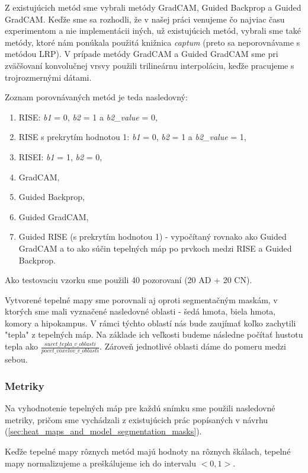 Z existujúcich metód sme vybrali metódy GradCAM, Guided Backprop a Guided GradCAM. Keďže sme sa rozhodli, že v našej práci venujeme čo najviac času experimentom a nie implementácii iných, už existujúcich metód, vybrali sme také metódy, ktoré nám ponúkala použitá knižnica \textit{captum} (preto sa neporovnávame s metódou LRP). V prípade metódy GradCAM a Guided GradCAM sme pri zväčšovaní konvolučnej vrsvy použili trilineárnu interpoláciu, keďže pracujeme s trojrozmernými dátami.

Zoznam porovnávaných metód je teda nasledovný:

\begin{enumerate}[label=\Alph*]
    \item RISE: \textit{b1} = 0, \textit{b2} = 1 a \textit{b2\_value} = 0,
    \item RISE s prekrytím hodnotou 1: \textit{b1} = 0, \textit{b2} = 1 a \textit{b2\_value} = 1,
    \item RISEI: \textit{b1} = 1, \textit{b2} = 0,
    \item GradCAM,
    \item Guided Backprop,
    \item Guided GradCAM,
    \item Guided RISE (s prekrytím hodnotou 1) - vypočítaný rovnako ako Guided GradCAM a to ako súčin tepelných máp po prvkoch medzi RISE a Guided Backprop.
\end{enumerate}

Ako testovaciu vzorku sme použili 40 pozorovaní (20 AD + 20 CN).

Vytvorené tepelné mapy sme porovnali aj oproti segmentačným maskám, v ktorých sme mali vyznačené nasledovné oblasti - šedá hmota, biela hmota, komory a hipokampus. V rámci týchto oblastí nás bude zaujímať koľko zachytili "tepla" z tepelných máp. Na základe ich veľkosti budeme následne počítať hustotu tepla ako $\frac{sucet\_tepla\_v\_oblasti}{pocet\_voxelov\_v\_ oblasti}$. Zároveň jednotlivé oblasti dáme do pomeru medzi sebou. 

\subsubsection{Metriky \label{sec:verification_experiments_metrics}}

Na vyhodnotenie tepelných máp pre každú snímku sme použili nasledovné metriky, pričom sme vychádzali z existujúcich prác popísaných v návrhu (\ref{sec:heat_maps_and_model_segmentation_masks}). 

Keďže tepelné mapy rôznych metód majú hodnoty na rôznych škálach, tepelné mapy normalizujeme a preškálujeme ich do intervalu $<0, 1>$.

